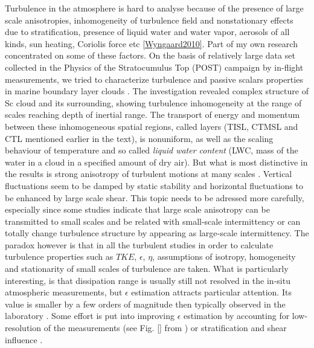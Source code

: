 \documentclass[../main.tex]{subfiles}
\begin{document}
Turbulence in the atmosphere is hard to analyse because of the presence of large scale anisotropies, inhomogeneity of turbulence field and nonstationary effects due to stratification, presence of liquid water and water vapor, aerosols of all kinds, sun heating, Coriolis force etc \ref{Wyngaard2010}. Part of my own research concentrated on some of these factors. On the basis of relatively large data set collected in the Physics of the Stratocumulus Top (POST) campaign by in-flight measurements, we tried to characterize turbulence and passive scalars properties in marine boundary layer clouds \citep{Jen-LaPlante2016, Ma2017}. The investigation revealed complex structure of Sc cloud and its surrounding, showing turbulence inhomogeneity at the range of scales reaching depth of inertial range. The transport of energy and momentum between these inhomogeneous spatial regions, called layers (TISL, CTMSL and CTL mentioned earlier in the text), is nonuniform, as well as the scaling behaviour of temperature and so called \emph{liquid water content} (LWC, mass of the water in a cloud in a specified amount of dry air). But what is most distinctive in the results is strong anisotropy of turbulent motions at many scales \citep{Pedersen2018}. Vertical fluctuations seem to be damped by static stability and horizontal fluctuations to be enhanced by large scale shear. This topic needs to be adressed more carefully, especially since some studies indicate that large scale anisotropy can be transmitted to small scales and be related with small-scale intermittency \citep{Warhaft2002} or can totally change turbulence structure by appearing as large-scale intermittency\citep{Takahashi2018}. The paradox however is that in all the turbulent studies in order to calculate turbulence properties such as $TKE$, $\epsilon$, $\eta$, assumptions of isotropy, homogeneity and stationarity of small scales of turbulence are taken. What is particularly interesting, is that dissipation range is usually still not resolved in the in-situ atmospheric measurements, but $\epsilon$ estimation attracts particular attention. Its value is smaller by a few orders of magnitude then typically observed in the laboratory \citep{Siebert2009, Jen-LaPlante2016}. Some effort is put into improving $\epsilon$ estimation by accounting for low-resolution of the measurements (see Fig. \ref{} from \citet{Waclawczyk2017}) or stratification and shear influence \citep{Zilitinkevich2019}. \\
\end{document}
